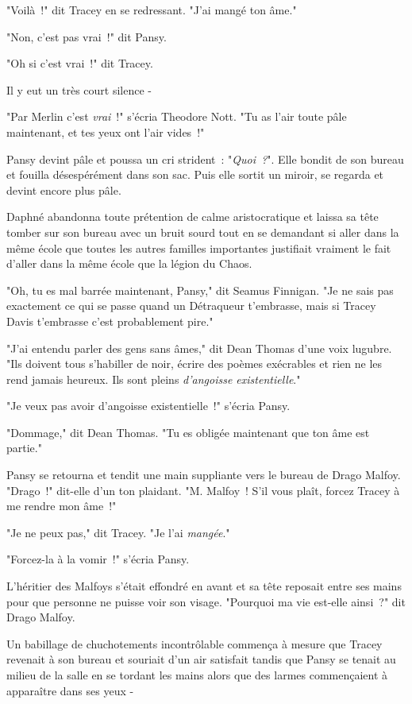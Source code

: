 "Voilà~!" dit Tracey en se redressant. "J'ai mangé ton âme."

"Non, c'est pas vrai~!" dit Pansy.

"Oh si c'est vrai~!" dit Tracey.

Il y eut un très court silence -

"Par Merlin c'est \emph{vrai}~!" s'écria Theodore Nott. "Tu as l'air toute pâle maintenant, et tes yeux ont l'air vides~!"

Pansy devint pâle et poussa un cri strident~: "\emph{Quoi~?}". Elle bondit de son bureau et fouilla désespérément dans son sac. Puis elle sortit un miroir, se regarda et devint encore plus pâle.

Daphné abandonna toute prétention de calme aristocratique et laissa sa tête tomber sur son bureau avec un bruit sourd tout en se demandant si aller dans la même école que toutes les autres familles importantes justifiait vraiment le fait d'aller dans la même école que la légion du Chaos.

"Oh, tu es mal barrée maintenant, Pansy," dit Seamus Finnigan. "Je ne sais pas exactement ce qui se passe quand un Détraqueur t'embrasse, mais si Tracey Davis t'embrasse c'est probablement pire."

"J'ai entendu parler des gens sans âmes," dit Dean Thomas d'une voix lugubre. "Ils doivent tous s'habiller de noir, écrire des poèmes exécrables et rien ne les rend jamais heureux. Ils sont pleins \emph{d'angoisse existentielle}."

"Je veux pas avoir d'angoisse existentielle~!" s'écria Pansy.

"Dommage," dit Dean Thomas. "Tu es obligée maintenant que ton âme est partie."

Pansy se retourna et tendit une main suppliante vers le bureau de Drago Malfoy. "Drago~!" dit-elle d'un ton plaidant. "M. Malfoy~! S'il vous plaît, forcez Tracey à me rendre mon âme~!"

"Je ne peux pas," dit Tracey. "Je l'ai \emph{mangée}."

"Forcez-la à la vomir~!" s'écria Pansy.

L'héritier des Malfoys s'était effondré en avant et sa tête reposait entre ses mains pour que personne ne puisse voir son visage. "Pourquoi ma vie est-elle ainsi~?" dit Drago Malfoy.

Un babillage de chuchotements incontrôlable commença à mesure que Tracey revenait à son bureau et souriait d'un air satisfait tandis que Pansy se tenait au milieu de la salle en se tordant les mains alors que des larmes commençaient à apparaître dans ses yeux -

